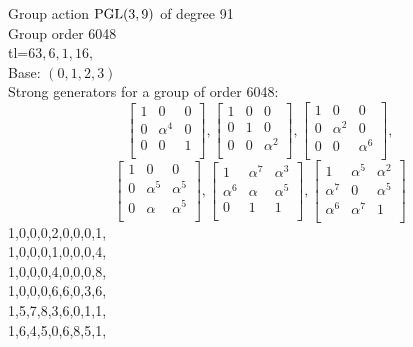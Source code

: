 Group action ${\rm PGL}(3,9)$ of degree 91\\
Group order 6048\\
tl=$63, 6, 1, 16, $\\
Base: $( 0, 1, 2, 3 )$\\
{\small\arraycolsep=2pt
Strong generators for a group of order 6048:
$$
\left[
\begin{array}{*{3}{r}}
1 & 0 & 0\\
0 & \alpha^{4} & 0\\
0 & 0 & 1\\
\end{array}
\right]
, 
\left[
\begin{array}{*{3}{r}}
1 & 0 & 0\\
0 & 1 & 0\\
0 & 0 & \alpha^{2}\\
\end{array}
\right]
, 
\left[
\begin{array}{*{3}{r}}
1 & 0 & 0\\
0 & \alpha^{2} & 0\\
0 & 0 & \alpha^{6}\\
\end{array}
\right]
, 
$$
$$
\left[
\begin{array}{*{3}{r}}
1 & 0 & 0\\
0 & \alpha^{5} & \alpha^{5}\\
0 & \alpha  & \alpha^{5}\\
\end{array}
\right]
, 
\left[
\begin{array}{*{3}{r}}
1 & \alpha^{7} & \alpha^{3}\\
\alpha^{6} & \alpha  & \alpha^{5}\\
0 & 1 & 1\\
\end{array}
\right]
, 
\left[
\begin{array}{*{3}{r}}
1 & \alpha^{5} & \alpha^{2}\\
\alpha^{7} & 0 & \alpha^{5}\\
\alpha^{6} & \alpha^{7} & 1\\
\end{array}
\right]
$$
1,0,0,0,2,0,0,0,1,\\
1,0,0,0,1,0,0,0,4,\\
1,0,0,0,4,0,0,0,8,\\
1,0,0,0,6,6,0,3,6,\\
1,5,7,8,3,6,0,1,1,\\
1,6,4,5,0,6,8,5,1,\\
}

